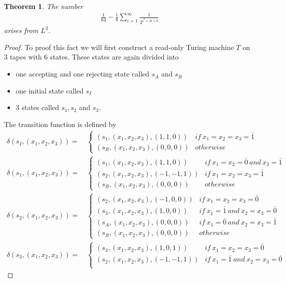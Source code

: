 \documentclass[12pt,a4paper]{scrartcl}
\theoremstyle{plain}
\newtheorem{Theorem}{Theorem}[section]
\theoremstyle{definition}
\numberwithin{equation}{section}
\newcommand{\2}{\mathbb{Z} / 2 \mathbb{Z}}
\newcommand{\1}{\bar{1}}
\newcommand{\0}{\bar{0}}
\begin{document}
\begin{Theorem}
	The number
	\begin{align*}
		\frac{1}{64} - \frac{1}{8} \sum_{i = 1}^{\infty} \frac{1}{2^{i^2 + 3i + 6}}
	\end{align*}
	arises from $L^3$.
\end{Theorem}
\begin{proof}
	To proof this fact we will first construct a read-only Turing machine $T$ on $3$ tapes with $6$ states. These states are again divided into
	\begin{itemize}
		\item one accepting and one rejecting state called $s_A$ and $s_R$
		\item one initial state called $s_I$
		\item $3$ states called $s_1, s_2$ and $s_3$.
	\end{itemize}
	The transition function is defined by
	\begin{align*}
		\delta(s_I, (x_1, x_2, x_3)) =&~ \begin{cases}
			(s_1, (x_1, x_2, x_3), (1, 1, 0)) & if \ x_1 = x_2 = x_3 = \1 \\
			(s_R, (x_1, x_2, x_3), (0, 0, 0)) & otherwise
		\end{cases} \\
		\delta(s_1, (x_1, x_2, x_3)) =&~ \begin{cases}
			(s_1, (x_1, x_2, x_3), (1, 1, 0)) & if \ x_1 = x_2 = \0 \ and \ x_3 = \1 \\
			(s_2, (x_1, x_2, x_3), (-1, -1, 1)) & if \ x_1 = x_2 = x_3 = \1 \\
			(s_R, (x_1, x_2, x_3), (0, 0, 0)) & otherwise
		\end{cases} \\
		\delta(s_2, (x_1, x_2, x_3)) =&~ \begin{cases}
			(s_2, (x_1, x_2, x_3), (-1, 0, 0)) & if \ x_1 = x_2 = x_3 = \0  \\
			(s_3, (x_1, x_2, x_3), (1, 0, 0)) & if \ x_1 = \1 \ and \ x_2 = x_3 = \0 \\
			(s_A, (x_1, x_2, x_3), (0, 0, 0)) & if \ x_1 = \0 \ and \ x_2 = x_3 = \1  \\ 
			(s_R, (x_1, x_2, x_3), (0, 0, 0)) & otherwise
		\end{cases} \\
		\delta(s_3, (x_1, x_2, x_3)) =&~ \begin{cases}
			(s_3, (x_1, x_2, x_3), (1, 0, 1)) & if \ x_1 = x_2 = x_3 = \0 \\
			(s_2, (x_1, x_2, x_3), (-1, -1, 1)) & if \ x_1 = \1 \ and \ x_2 = x_3 = \0 \\

\end{cases}
\end{align*}
\end{proof}
\end{document}
